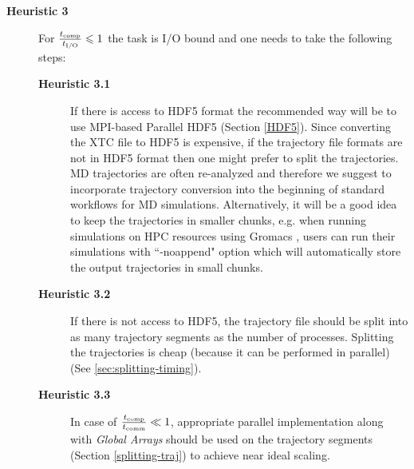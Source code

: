 \begin{description}
  \item[\textbf{Heuristic 3}] For $\frac{{t}_{\text{comp}}}{{t}_{\text{I/O}}} \leqslant 1$ the task is I/O bound and one needs to take the following steps:  
  \begin{description}
    \item[\textbf{Heuristic 3.1}] If there is access to HDF5 format the recommended way will be to use MPI-based Parallel HDF5 (Section \ref{HDF5}). Since converting the XTC file to HDF5 is expensive, if the trajectory file formats are not in HDF5 format then one might prefer to split the trajectories. MD trajectories are often re-analyzed and therefore we suggest to incorporate trajectory conversion into the beginning of standard workflows for MD simulations. 
 Alternatively, it will be a good idea to keep the trajectories in smaller chunks, e.g. when running simulations on HPC resources using Gromacs \cite{Gromacs3, Gromacs1}, users can run their simulations with ``-noappend" option which   will automatically store the output trajectories in small chunks.
    \item[\textbf{Heuristic 3.2}] If there is not access to HDF5, the trajectory file should be split into as many trajectory segments as the number of processes. Splitting the trajectories is cheap (because it can be performed in parallel) (See \ref{sec:splitting-timing}).
    \item[\textbf{Heuristic 3.3}] In case of $\frac{{t}_{\text{comp}}}{t_{\text{comm}}} \ll 1$, appropriate parallel implementation along with \emph{Global Arrays} should be used on the trajectory segments (Section \ref{splitting-traj}) to achieve near ideal scaling.
  \end{description}
\end{description}
